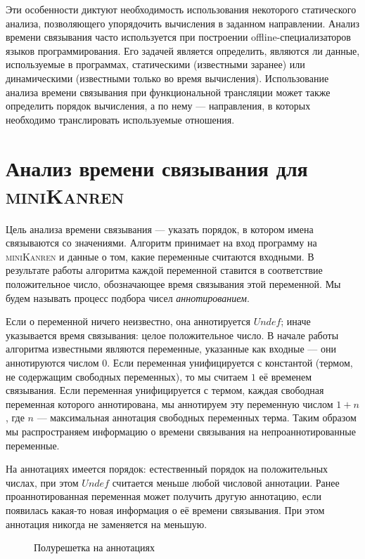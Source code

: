 \documentclass[conference,a4paper,american,russian]{IEEEtran}
\newcommand{\miniKanren}{\textsc{miniKanren}}
\begin{document}
Эти особенности диктуют необходимость использования некоторого статического анализа, позволяющего упорядочить вычисления в заданном направлении.
Анализ времени связывания часто используется при построении offline-специализаторов языков программирования.
Его задачей является определить, являются ли данные, используемые в программах, статическими (известными заранее) или динамическими (известными только во время вычисления).
Использование анализа времени связывания при функциональной трансляции может также определить порядок вычисления, а по нему --- направления, в которых необходимо транслировать используемые отношения.

\section{Анализ времени связывания для \miniKanren{}}\label{bta}

Цель анализа времени связывания --- указать порядок, в котором имена связываются со значениями.
Алгоритм принимает на вход программу на \miniKanren{} и данные о том, какие переменные считаются входными.
В результате работы алгоритма каждой переменной ставится в соответствие положительное число, обозначающее время связывания этой переменной.
Мы будем называть процесс подбора чисел \emph{аннотированием}.

Если о переменной ничего неизвестно, она аннотируется $Undef$; иначе указывается время связывания: целое положительное число.
В начале работы алгоритма известными являются переменные, указанные как входные --- они аннотируются числом $0$.
Если переменная унифицируется с константой (термом, не содержащим свободных переменных), то мы считаем $1$ её временем связывания.
Если переменная унифицируется с термом, каждая свободная переменная которого аннотирована, мы аннотируем эту переменную числом $1+n$, где $n$ --- максимальная аннотация свободных переменных терма.
Таким образом мы распространяем информацию о времени связывания на непроаннотированные переменные.

На аннотациях имеется порядок: естественный порядок на положительных числах, при этом $Undef$ считается меньше любой числовой аннотации.
Ранее проаннотированная переменная может получить другую аннотацию, если появилась какая-то новая информация о её времени связывания.
При этом аннотация никогда не заменяется на меньшую.

\begin{figure}[htbp]
  \centering
  \caption{Полурешетка на аннотациях}
  \label{fig:image}
\end{figure}
\end{document}
